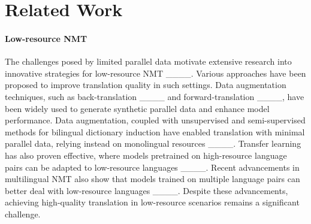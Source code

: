 \section{Related Work}

\paragraph{Low-resource NMT}
The challenges posed by limited parallel data motivate extensive research into innovative strategies for low-resource NMT
____. 
Various approaches have been proposed to improve translation quality in such settings. Data augmentation techniques, such as back-translation ____ and forward-translation ____, have been widely used to generate synthetic parallel data and enhance model performance. 
Data augmentation, coupled with unsupervised and semi-supervised methods for bilingual dictionary induction have enabled translation with minimal parallel data, relying instead on monolingual resources ____.
Transfer learning has also proven effective, where models pretrained on high-resource language pairs can be adapted to low-resource languages ____. 
Recent advancements in multilingual NMT also show that models trained on multiple language pairs can better deal with low-resource languages ____.
Despite these advancements, achieving high-quality translation in low-resource scenarios remains a significant challenge.

